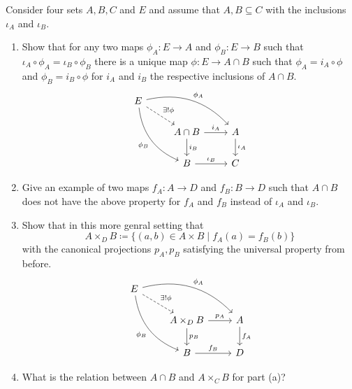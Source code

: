\begin{Exercise}
    Consider four sets $ A , B , C $ and $ E $ and assume that $ A , B \subseteq C $ with the inclusions $ \iota_A $ and $ \iota_B $.
    
    \begin{enumerate}[label=(\alph*)]
        \item 
        Show that for any two maps $ \phi_A \colon E \to A $ and $ \phi_B \colon E  \to B $ such that $ \iota_A \circ \phi_A = \iota_B \circ \phi_B $ there is a unique map $ \phi \colon E \to A \cap B $ such that $ \phi_A = i_A \circ \phi $ and $ \phi_B = i_B \circ \phi $ for $ i_A $ and $ i_B $ the respective inclusions of $ A \cap B $. 
        \[
        \begin{tikzcd}
            E 
            \ar[rd, dashed, " \exists ! \phi" ]
            \ar[rrd, bend left, " \phi_A" ]
            \ar[rdd, bend right, " \phi_B" ']
            \\
            &
            A \cap B
            \ar[r , " i_A " ]
            \ar[d , " i_B " ]
            &
            A
            \ar[ d , " \iota_A" ]
            \\
            &
            B
            \ar[r, " \iota_B " ]
            &
            C
        \end{tikzcd}
        \]
    
        \item 
        Give an example of two maps $ f_A \colon A \to D $ and $ f_B \colon B \to D $ such that $ A \cap B $ does not have the above property for $ f_A $ and $ f_B $ instead of $ \iota_A $ and $ \iota_B $.
    
        \item 
        Show that in this more genral setting that
        \[
            A \times_D B \coloneqq \{ ( a, b ) \in A \times B \mid f_A ( a ) = f_B ( b ) \}
        \]
        with the canonical projections $ p_A, p_B$ satisfying the universal property from before.
        \[
        \begin{tikzcd}
            E 
            \ar[rd, dashed, " \exists ! \phi" ]
            \ar[rrd, bend left, " \phi_A" ]
            \ar[rdd, bend right, " \phi_B" ']
            \\
            &
            A \times_D B
            \ar[r , " p_A " ]
            \ar[d , " p_B " ]
            &
            A
            \ar[ d , " f_A" ]
            \\
            &
            B
            \ar[r, " f_B " ]
            &
            D
        \end{tikzcd}
        \]
    
        \item 
        What is the relation between $ A \cap B $ and $ A \times_C B$ for part (a)?
    \end{enumerate}
\end{Exercise}
    


